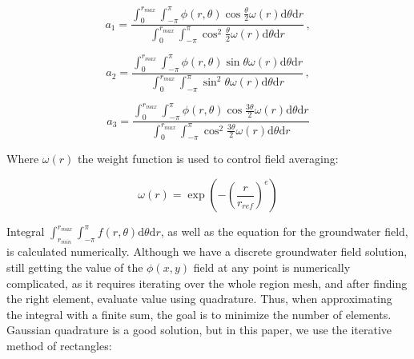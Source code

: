 \documentclass[]{pracamgr}
\begin{document}
      \begin{equation}
        \label{a1_num}
        a_1 = \frac{\int^{r_{max}}_{0} \int^{\pi}_{-\pi} \phi(r, \theta) \cos \frac{\theta}{2} \omega(r) \textrm{d} \theta \textrm{d} r}{\int^{r_{max}}_{0} \int^{\pi}_{-\pi} \cos^2 \frac{\theta}{2} \omega(r) \textrm{d} \theta \textrm{d} r} \,,
      \end{equation} 
      
      \begin{equation}
        \label{a2_num}
        a_2 = \frac{\int^{r_{max}}_{0} \int^{\pi}_{-\pi} \phi(r, \theta) \sin \theta \omega(r) \textrm{d} \theta \textrm{d} r}{\int^{r_{max}}_{0} \int^{\pi}_{-\pi} \sin^2 \theta \omega(r) \textrm{d} \theta \textrm{d} r} \,,
      \end{equation}
      
      \begin{equation}
        \label{a3_num}
        a_3 = \frac{\int^{r_{max}}_{0} \int^{\pi}_{-\pi} \phi(r, \theta) \cos \frac{3 \theta}{2} \omega(r) \textrm{d} \theta \textrm{d} r}{\int^{r_{max}}_{0} \int^{\pi}_{-\pi} \cos^2 \frac{3 \theta}{2} \omega(r) \textrm{d} \theta \textrm{d} r}
      \end{equation}	

      Where $\omega(r)$ the weight function is used to control field averaging:

      \begin{equation}
        \label{integration_weight}
        \omega(r) = \exp(-{(\frac{r}{r_{ref}})}^e)
      \end{equation}

      Integral $\int^{r_{max}}_{r_{min}} \int^{\pi}_{-\pi} f(r, \theta) \textrm{d} \theta \textrm{d} r$, as well as the equation for the groundwater field, is calculated numerically. Although we have a discrete groundwater field solution, still getting the value of the $\phi(x, y)$ field at any point is numerically complicated, as it requires iterating over the whole region mesh, and after finding the right element, evaluate value using quadrature. Thus, when approximating the integral with a finite sum, the goal is to minimize the number of elements. Gaussian quadrature is a good solution, but in this paper, we use the iterative method of rectangles:
\end{document}

